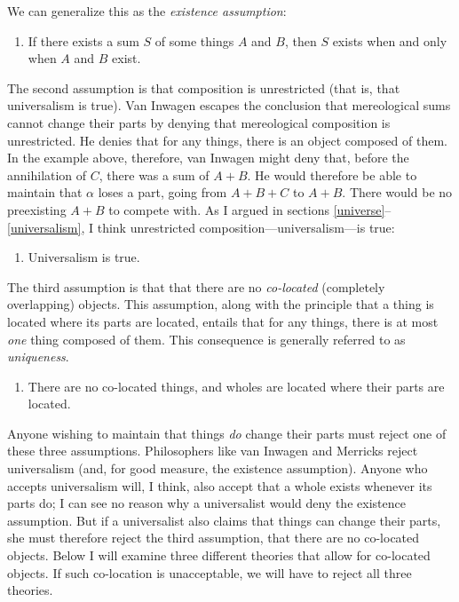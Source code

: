 \documentclass[11pt]{article}
\begin{document}
\begin{spacing}{1.5}
We can generalize this as the {\em existence assumption}:

\begin{enumerate}[ref=(\arabic*)]
  \item If there exists a sum $S$ of some things $A$ and $B$, then $S$
    exists when and only when $A$ and $B$ exist. \label{ass-ex}
\end{enumerate}

The second assumption is that composition is unrestricted (that is,
that universalism is true).  Van Inwagen escapes the conclusion that
mereological sums cannot change their parts by denying that
mereological composition is unrestricted.  He denies that for any
things, there is an object composed of them.  In the example above,
therefore, van Inwagen might deny that, before the annihilation of
$C$, there was a sum of $A + B$.  He would therefore be able to
maintain that $\alpha$ loses a part, going from $A + B + C$ to $A +
B$.  There would be no preexisting $A + B$ to compete with.  As I
argued in sections \ref{universe}--\ref{universalism}, I think
unrestricted composition---universalism---is true:

\begin{enumerate}[start=2, ref=(\arabic*)]
  \item Universalism is true. \label{ass-uni}
\end{enumerate}

The third assumption is that that there are no {\em co-located}
(completely overlapping) objects.  This assumption, along with the
principle that a thing is located where its parts are located, entails
that for any things, there is at most {\em one} thing composed of
them.  This consequence is generally referred to as {\em uniqueness}.

\begin{enumerate}[start=3, ref=(\arabic*)]
  \item There are no co-located things, and wholes are located where
    their parts are located. \label{ass-co}
\end{enumerate}

Anyone wishing to maintain that things {\em do} change their parts
must reject one of these three assumptions.  Philosophers like van
Inwagen and Merricks reject universalism (and, for good measure, the
existence assumption).  Anyone who accepts universalism will, I think,
also accept that a whole exists whenever its parts do; I can see no
reason why a universalist would deny the existence assumption.  But if
a universalist also claims that things can change their parts, she
must therefore reject the third assumption, that there are no
co-located objects.  Below I will examine three different theories
that allow for co-located objects.  If such co-location is
unacceptable, we will have to reject all three theories.


\end{spacing}
\end{document}
